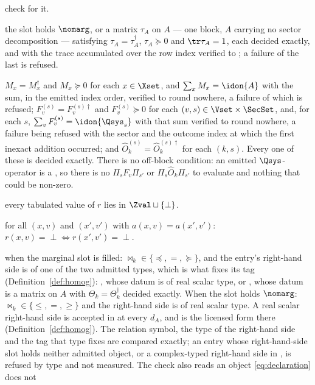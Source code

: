 \begin{definition}
\begin{description}[leftmargin=3.0em,style=nextline]
  check for it.
\item[V2 (\tref{marginal slot})] the slot holds $\nomarg$, or a matrix $\tau_A$ on $A$
  --- one block, $A$ carrying no sector decomposition --- satisfying
  $\tau_A=\tau_A^{\dagger}$, $\tau_A\succeq0$ and $\tr\tau_A=1$, each decided
  exactly, and with the trace accumulated over the row index verified to
  ; a failure of the last is refused.
\item[V3 (operators, block by block)]
  $M_x=M_x^{\dagger}$ and $M_x\succeq0$ for each $x\in\Xset$, and
  $\sum_xM_x=\idon{A}$ with the sum, in the emitted index order, verified to
  round nowhere, a failure of which is refused;
  $F_v^{(s)}=F_v^{(s)\dagger}$ and $F_v^{(s)}\succeq0$ for each
  $(v,s)\in\Vset\times\SecSet$, and, for each $s$,
  $\sum_vF_v^{(s)}=\idon{\Qsys_s}$ with that sum verified to round nowhere, a
  failure being refused with the sector and the outcome index at which the
  first inexact addition occurred; and
  $\hat O_k^{(s)}=\hat O_k^{(s)\dagger}$ for each $(k,s)$. Every one of these
  is decided exactly. There is no off-block condition: an emitted
  $\Qsys$-operator is a , so there is no $\Pi_sF_v\Pi_{s'}$ or
  $\Pi_s\hat O_k\Pi_{s'}$ to evaluate and nothing that could be non-zero.
\item[V4 (key alphabet)] every tabulated value of $r$ lies in
  $\Zval\sqcup\{\perp\}$.
\item[V5 (sifting consistency)] for all $(x,v)$ and $(x',v')$ with
  $a(x,v)=a(x',v')$: $r(x,v)=\perp\iff r(x',v')=\perp$.
\item[V6 (constraint typing, including the tag)] when the marginal
  slot is filled: $\bowtie_k\in\{\preceq,=,\succeq\}$, and the entry's
  right-hand side is of one of the two admitted types, which is what fixes its
  tag (Definition~\ref{def:homog}): , whose datum is of
  real scalar type, or , whose datum is a matrix on $A$ with
  $\Theta_k=\Theta_k^{\dagger}$ decided exactly. When the slot holds
  $\nomarg$: $\bowtie_k\in\{\le,=,\ge\}$ and the right-hand side is of real
  scalar type. A real scalar right-hand side is accepted in
   at every $d_A$, and is the licensed form there
  (Definition~\ref{def:homog}). The relation symbol, the type of the
  right-hand side and the tag that type fixes are compared exactly; an entry
  whose right-hand-side slot holds neither admitted object, or a complex-typed
  right-hand side in , is refused by type and not
  measured. The check also reads an object \eqref{eq:declaration} does not

\end{description}
\end{definition}
